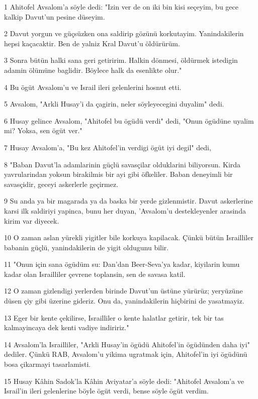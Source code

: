 \par 1 Ahitofel Avsalom'a söyle dedi: "Izin ver de on iki bin kisi seçeyim, bu gece kalkip Davut'un pesine düseyim.
\par 2 Davut yorgun ve güçsüzken ona saldirip gözünü korkutayim. Yanindakilerin hepsi kaçacaktir. Ben de yalniz Kral Davut'u öldürürüm.
\par 3 Sonra bütün halki sana geri getiririm. Halkin dönmesi, öldürmek istedigin adamin ölümüne baglidir. Böylece halk da esenlikte olur."
\par 4 Bu ögüt Avsalom'u ve Israil ileri gelenlerini hosnut etti.
\par 5 Avsalom, "Arkli Husay'i da çagirin, neler söyleyecegini duyalim" dedi.
\par 6 Husay gelince Avsalom, "Ahitofel bu ögüdü verdi" dedi, "Onun ögüdüne uyalim mi? Yoksa, sen ögüt ver."
\par 7 Husay Avsalom'a, "Bu kez Ahitofel'in verdigi ögüt iyi degil" dedi,
\par 8 "Baban Davut'la adamlarinin güçlü savasçilar olduklarini biliyorsun. Kirda yavrularindan yoksun birakilmis bir ayi gibi öfkeliler. Baban deneyimli bir savasçidir, geceyi askerlerle geçirmez.
\par 9 Su anda ya bir magarada ya da baska bir yerde gizlenmistir. Davut askerlerine karsi ilk saldiriyi yapinca, bunu her duyan, 'Avsalom'u destekleyenler arasinda kirim var diyecek.
\par 10 O zaman aslan yürekli yigitler bile korkuya kapilacak. Çünkü bütün Israilliler babanin güçlü, yanindakilerin de yigit oldugunu bilir.
\par 11 "Onun için sana ögüdüm su: Dan'dan Beer-Seva'ya kadar, kiyilarin kumu kadar olan Israilliler çevrene toplansin, sen de savasa katil.
\par 12 O zaman gizlendigi yerlerden birinde Davut'un üstüne yürürüz; yeryüzüne düsen çiy gibi üzerine gideriz. Onu da, yanindakilerin hiçbirini de yasatmayiz.
\par 13 Eger bir kente çekilirse, Israilliler o kente halatlar getirir, tek bir tas kalmayincaya dek kenti vadiye indiririz."
\par 14 Avsalom'la Israilliler, "Arkli Husay'in ögüdü Ahitofel'in ögüdünden daha iyi" dediler. Çünkü RAB, Avsalom'u yikima ugratmak için, Ahitofel'in iyi ögüdünü bosa çikarmayi tasarlamisti.
\par 15 Husay Kâhin Sadok'la Kâhin Aviyatar'a söyle dedi: "Ahitofel Avsalom'a ve Israil'in ileri gelenlerine böyle ögüt verdi, bense söyle ögüt verdim.
